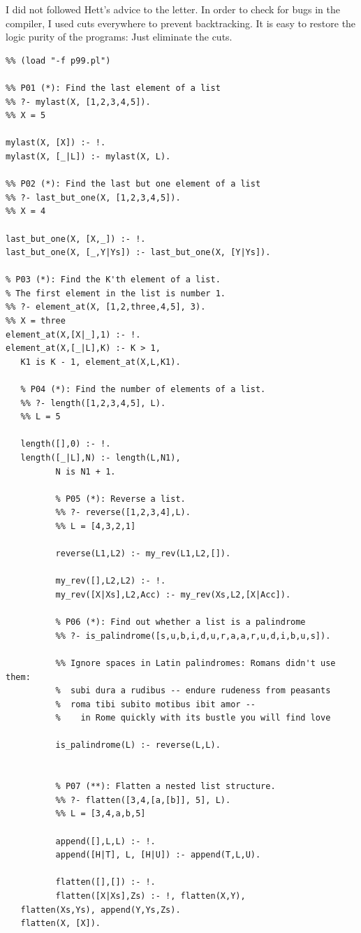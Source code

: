 \documentclass[a4paper,12pt]{book}
\begin{document}
I did not followed Hett's advice to the letter. In order
to check for bugs in the compiler, I used cuts everywhere
to prevent backtracking. It is easy to restore the logic
purity of the programs: Just eliminate the cuts.
\pagebreak
\begin{verbatim}
%% (load "-f p99.pl")

%% P01 (*): Find the last element of a list
%% ?- mylast(X, [1,2,3,4,5]).
%% X = 5

mylast(X, [X]) :- !.
mylast(X, [_|L]) :- mylast(X, L).

%% P02 (*): Find the last but one element of a list
%% ?- last_but_one(X, [1,2,3,4,5]).
%% X = 4

last_but_one(X, [X,_]) :- !.
last_but_one(X, [_,Y|Ys]) :- last_but_one(X, [Y|Ys]).

% P03 (*): Find the K'th element of a list.
% The first element in the list is number 1.
%% ?- element_at(X, [1,2,three,4,5], 3).
%% X = three
element_at(X,[X|_],1) :- !.
element_at(X,[_|L],K) :- K > 1,
   K1 is K - 1, element_at(X,L,K1).

   % P04 (*): Find the number of elements of a list.
   %% ?- length([1,2,3,4,5], L).
   %% L = 5

   length([],0) :- !.
   length([_|L],N) :- length(L,N1),
		  N is N1 + 1.

		  % P05 (*): Reverse a list.
		  %% ?- reverse([1,2,3,4],L).
		  %% L = [4,3,2,1]

		  reverse(L1,L2) :- my_rev(L1,L2,[]).

		  my_rev([],L2,L2) :- !.
		  my_rev([X|Xs],L2,Acc) :- my_rev(Xs,L2,[X|Acc]).

		  % P06 (*): Find out whether a list is a palindrome
		  %% ?- is_palindrome([s,u,b,i,d,u,r,a,a,r,u,d,i,b,u,s]).

		  %% Ignore spaces in Latin palindromes: Romans didn't use them:
		  %  subi dura a rudibus -- endure rudeness from peasants
		  %  roma tibi subito motibus ibit amor -- 
		  %    in Rome quickly with its bustle you will find love

		  is_palindrome(L) :- reverse(L,L).


		  % P07 (**): Flatten a nested list structure.
		  %% ?- flatten([3,4,[a,[b]], 5], L).
		  %% L = [3,4,a,b,5]

		  append([],L,L) :- !.
		  append([H|T], L, [H|U]) :- append(T,L,U).

		  flatten([],[]) :- !.
		  flatten([X|Xs],Zs) :- !, flatten(X,Y),
   flatten(Xs,Ys), append(Y,Ys,Zs).
   flatten(X, [X]).


\end{verbatim}
\end{document}

